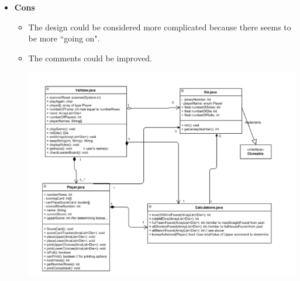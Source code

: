 \documentclass[]{report}   %
\begin{document}
\begin{itemize}
\begin{itemize}
\begin{itemize}
		\end{itemize}
	\item \textbf{Cons}
		\begin{itemize}
		\item The design could be considered more complicated because there seems to be more ``going on".
		\item The comments could be improved.
		\begin{center}
		\includegraphics[width=5.5in]{Graphics/DAA1-A1.png} 
		\end{center}
		\end{itemize}
		

\end{itemize}
\end{itemize}
\end{document}
